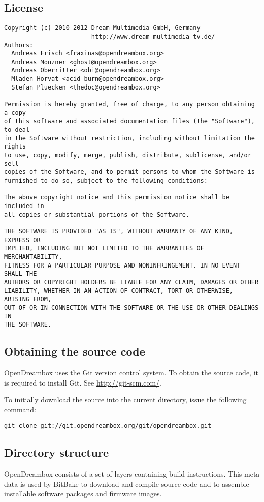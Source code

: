 \documentclass[a4paper]{article}
\newcommand{\shell}[1]{\texttt{\small #1}}
\begin{document}
  \subsection{License}

    \begin{verbatim}
Copyright (c) 2010-2012 Dream Multimedia GmbH, Germany
                        http://www.dream-multimedia-tv.de/
Authors:
  Andreas Frisch <fraxinas@opendreambox.org>
  Andreas Monzner <ghost@opendreambox.org>
  Andreas Oberritter <obi@opendreambox.org>
  Mladen Horvat <acid-burn@opendreambox.org>
  Stefan Pluecken <thedoc@opendreambox.org>

Permission is hereby granted, free of charge, to any person obtaining a copy
of this software and associated documentation files (the "Software"), to deal
in the Software without restriction, including without limitation the rights
to use, copy, modify, merge, publish, distribute, sublicense, and/or sell
copies of the Software, and to permit persons to whom the Software is
furnished to do so, subject to the following conditions:

The above copyright notice and this permission notice shall be included in
all copies or substantial portions of the Software.

THE SOFTWARE IS PROVIDED "AS IS", WITHOUT WARRANTY OF ANY KIND, EXPRESS OR
IMPLIED, INCLUDING BUT NOT LIMITED TO THE WARRANTIES OF MERCHANTABILITY,
FITNESS FOR A PARTICULAR PURPOSE AND NONINFRINGEMENT. IN NO EVENT SHALL THE
AUTHORS OR COPYRIGHT HOLDERS BE LIABLE FOR ANY CLAIM, DAMAGES OR OTHER
LIABILITY, WHETHER IN AN ACTION OF CONTRACT, TORT OR OTHERWISE, ARISING FROM,
OUT OF OR IN CONNECTION WITH THE SOFTWARE OR THE USE OR OTHER DEALINGS IN
THE SOFTWARE.
    \end{verbatim}

  \subsection{Obtaining the source code}
    OpenDreambox uses the Git version control system. To obtain the source
    code, it is required to install Git. See \url{http://git-scm.com/}.

    To initially download the source into the current directory, issue the
    following command:

    \shell{git clone git://git.opendreambox.org/git/opendreambox.git}

  \subsection{Directory structure}
    OpenDreambox consists of a set of layers containing build instructions.
    This meta data is used by BitBake to download and compile source code
    and to assemble installable software packages and firmware images.
\end{document}
